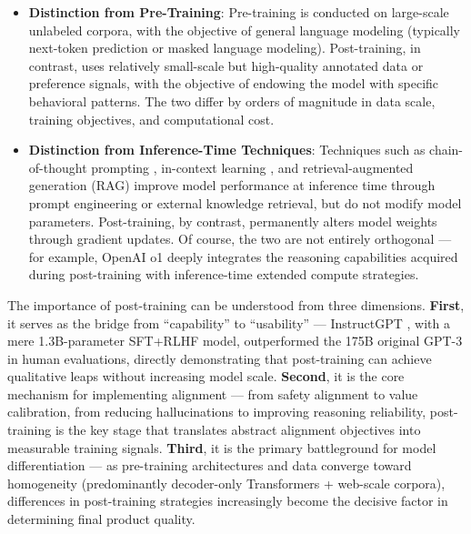 \begin{itemize}[leftmargin=2em]
  \item \textbf{Distinction from Pre-Training}:
    Pre-training is conducted on large-scale unlabeled corpora, with the objective of general language modeling (typically next-token prediction or masked language modeling).
    Post-training, in contrast, uses relatively small-scale but high-quality annotated data or preference signals, with the objective of endowing the model with specific behavioral patterns.
    The two differ by orders of magnitude in data scale, training objectives, and computational cost.

  \item \textbf{Distinction from Inference-Time Techniques}:
    Techniques such as chain-of-thought prompting \cite{wei2022cot},
    in-context learning \cite{brown2020gpt3},
    and retrieval-augmented generation (RAG) \cite{lewis2020rag}
    improve model performance at inference time through prompt engineering or external knowledge retrieval,
    but do not modify model parameters. Post-training, by contrast, permanently alters model weights through gradient updates.
    Of course, the two are not entirely orthogonal ---
    for example, OpenAI o1 \cite{openai2024o1} deeply integrates the reasoning capabilities acquired during post-training
    with inference-time extended compute strategies.
\end{itemize}

\noindent
The importance of post-training can be understood from three dimensions.
\textbf{First}, it serves as the bridge from ``capability'' to ``usability'' ---
InstructGPT \cite{ouyang2022instructgpt}, with a mere 1.3B-parameter SFT+RLHF model, outperformed
the 175B original GPT-3 in human evaluations, directly demonstrating that post-training can achieve
qualitative leaps without increasing model scale.
\textbf{Second}, it is the core mechanism for implementing alignment ---
from safety alignment to value calibration, from reducing hallucinations to improving reasoning reliability,
post-training is the key stage that translates abstract alignment objectives into measurable training signals.
\textbf{Third}, it is the primary battleground for model differentiation ---
as pre-training architectures and data converge toward homogeneity (predominantly decoder-only Transformers + web-scale corpora),
differences in post-training strategies increasingly become the decisive factor in determining final product quality.

